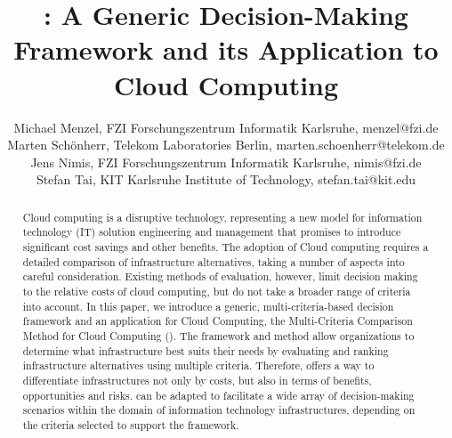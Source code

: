 \documentclass[journal,final,a4paper,twoside]{IEEEtran}
\begin{document}
\title{: A Generic Decision-Making Framework 
and its Application to Cloud Computing}


\author{Michael Menzel, FZI Forschungszentrum Informatik Karlsruhe, menzel@fzi.de\\
        Marten Sch\"onherr, Telekom Laboratories Berlin, marten.schoenherr@telekom.de\\
        Jens Nimis, FZI Forschungszentrum Informatik Karlsruhe, nimis@fzi.de\\
        Stefan Tai, KIT Karlsruhe Institute of Technology, stefan.tai@kit.edu}



















\maketitle


\begin{abstract}
Cloud computing is a disruptive technology, representing a new model for information technology (IT) solution engineering and management that promises to introduce significant cost savings and other benefits. The adoption of Cloud computing requires a detailed comparison of infrastructure alternatives, taking a number of aspects into careful consideration. Existing methods of evaluation, however, limit decision making to the relative costs of cloud computing, but do not take a broader range of criteria into account. In this paper, we introduce a generic, multi-criteria-based decision framework and an application for Cloud Computing, the Multi-Criteria Comparison Method for Cloud Computing (). The framework and method allow organizations to determine what infrastructure best suits their needs by evaluating and ranking infrastructure alternatives using multiple criteria. Therefore,  offers a way to differentiate infrastructures not only by costs, but also in terms of benefits, opportunities and risks.  can be adapted to facilitate a wide array of decision-making scenarios within the domain of information technology infrastructures, depending on the criteria selected to support the framework.
\end{abstract}
\end{document}
